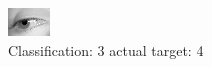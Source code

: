 \begin{figure}[h!]
\begin{center}
\includegraphics[width=0.60\columnwidth]{figures/ID3019_class_3_target_4.png}
\end{center}
\caption{ Classification: 3 actual target: 4}
\label{fig:ID3019_class_3_target_4}
\end{figure}
